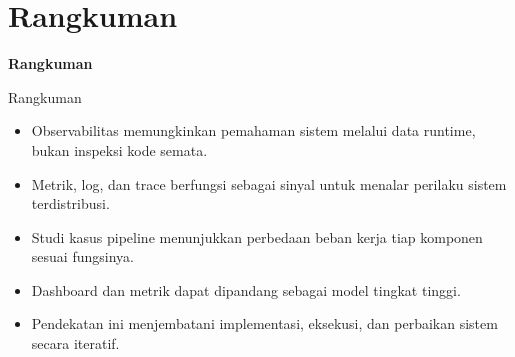 \documentclass[aspectratio=169, table]{beamer}
\begin{document}
\section{Rangkuman}
	
	\begin{frame}{\hfill}
		\centering
		\Huge{\textbf{Rangkuman}}
	\end{frame}

\begin{frame}{Rangkuman}
	\vspace{20pt}
	\begin{itemize}
		\item Observabilitas memungkinkan pemahaman sistem melalui data runtime, bukan inspeksi kode semata.
		\item Metrik, log, dan trace berfungsi sebagai sinyal untuk menalar perilaku sistem terdistribusi.
		\item Studi kasus pipeline menunjukkan perbedaan beban kerja tiap komponen sesuai fungsinya.
		\item Dashboard dan metrik dapat dipandang sebagai model tingkat tinggi.
		\item Pendekatan ini menjembatani implementasi, eksekusi, dan perbaikan sistem secara iteratif.
	\end{itemize}
\end{frame}
\end{document}
